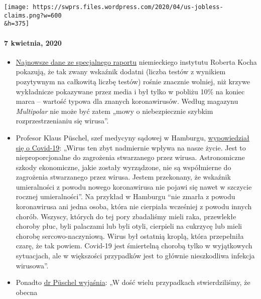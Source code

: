 \texttt{[image: https://swprs.files.wordpress.com/2020/04/us-jobless-claims.png?w=600\\\&h=375]}

\hypertarget{7-kwietnia-2020}{%
\paragraph{7 kwietnia, 2020}\label{7-kwietnia-2020}}

\begin{itemize}
\tightlist
\item
  \href{https://multipolar-magazin.de/artikel/coronavirus-regierung-ignoriert-daten}{Najnowsze
  dane ze specjalnego raportu} niemieckiego instytutu Roberta Kocha
  pokazują, że tak zwany wskaźnik dodatni (liczba testów z wynikiem
  pozytywnym na całkowitą liczbę testów) rośnie znacznie wolniej, niż
  krzywe wykładnicze pokazywane przez media i był tylko w pobliżu 10\%
  na koniec marca -- wartość typowa dla znanych koronawirusów. Według
  magazynu \emph{Multipolar} nie może być zatem „mowy o niebezpiecznie
  szybkim rozprzestrzenianiu się wirusa''.
\item
  Profesor Klaus Püschel, szef medycyny sądowej w Hamburgu,
  \href{https://www.pressreader.com/germany/hamburger-morgenpost/20200403/281487868456736}{wypowiedział
  się o Covid-19}: „Wirus ten zbyt nadmiernie wpływa na nasze życie.
  Jest to nieproporcjonalne do zagrożenia stwarzanego przez wirusa.
  Astronomiczne szkody ekonomiczne, jakie zostały wyrządzone, nie są
  współmierne do zagrożenia stwarzanego przez wirusa. Jestem przekonany,
  że wskaźnik umieralności z powodu nowego koronawirusa nie pojawi się
  nawet w szczycie rocznej umieralności''. Na przykład w Hamburgu ``nie
  zmarła z powodu koronawirusa ani jedna osoba, która nie cierpiała
  wcześniej z powodu innych chorób. Wszyscy, których do tej pory
  zbadaliśmy mieli raka, przewlekłe choroby płuc, byli palaczami lub
  byli otyli, cierpieli na cukrzycę lub mieli chorobę
  sercowo-naczyniową. Wirus był ostatnią kroplą, która przepełniła
  czarę, że tak powiem. Covid-19 jest śmiertelną chorobą tylko w
  wyjątkowych sytuacjach, ale w większości przypadków jest to głównie
  nieszkodliwa infekcja wirusowa''.
\item
  Ponadto
  \href{https://www.abendblatt.de/hamburg/article228828787/rechtsmedizin-pueschel-hamburg-corona-virus-infektion-covid-19-coronavirus-krise-patienten-krankenhaeuser-kliniken-infektionsrate-krankheit-pandemie-test-lungenkrankheit-sars-cov-epidemie-sars-cov-2.html}{dr
  Püschel wyjaśnia}: „W dość wielu przypadkach stwierdziliśmy, że obecna

\end{itemize}
